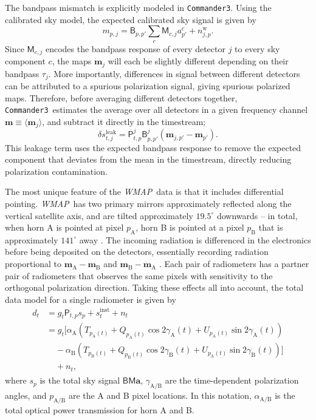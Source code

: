 \documentclass[twocolumn]{../../common/aa}
\def\WMAP{\emph{WMAP}}
\def\commanderthree{\texttt{Commander3}}
\newcommand{\A}[0]{\mathrm{A}}
\newcommand{\B}[0]{\mathrm{B}}
\begin{document}
The bandpass mismatch is explicitly modeled in \commanderthree. Using the calibrated sky model, the expected calibrated sky signal is given by
\begin{equation}
	m_{p,j}=\mathsf B_{p,p'}\sum_c\mathsf M_{c,j}a^c_{p'}+n_{j,p}^\mathrm w.
\end{equation}
Since $\mathsf M_{c,j}$ encodes the bandpass response of every detector $j$ to every sky component $c$, the maps $\boldsymbol m_j$ will each be slightly different depending on their bandpass $\tau_j$. More importantly, differences in signal between different detectors can be attributed to a spurious polarization signal, giving spurious polarized maps. Therefore, before averaging different detectors together, \commanderthree\ estimates the average over all detectors in a given frequency channel $\boldsymbol m\equiv \langle \boldsymbol m_j\rangle$, and subtract it directly in the timestream;
\begin{equation}
	\delta s_{t,j}^\mathrm{leak}=\mathsf P_{t,p}^j\mathsf B_{p,p'}^j\left(\boldsymbol m_{j,p'}-\boldsymbol m_{p'}\right).
\end{equation}
This leakage term uses the expected bandpass response to remove the expected component that deviates from the mean in the timestream, directly reducing polarization contamination.


The most unique feature of the \WMAP\ data is that it includes differential pointing.  \WMAP\ has two primary mirrors approximately reflected along the vertical satellite axis, and are tilted approximately $19.5^\circ$ downwards -- in total, when horn A is pointed at pixel $p_\A$, horn B is pointed at a pixel $p_\B$ that is approximately $141^\circ$ away \citep{page2003:MAP}. The incoming radiation is differenced in the electronics before being deposited on the detectors, essentially recording radiation proportional to $\boldsymbol m_\A-\boldsymbol m_\B$ and $\boldsymbol m_\B-\boldsymbol m_\A$ \citep{jarosik2003:MAP}. Each pair of radiometers has a partner pair of radiometers that observes the same pixels with sensitivity to the orthogonal polarization direction. Taking these effects all into account, the total data model for a single radiometer is given by
\begin{align}
	d_{t}&=g_{t}\mathsf P_{t,p}s_{p} + s^\mathrm{inst}_t+n_t
	\\
	&=g_t\Big[\alpha_\A(T_{p_\A(t)}+Q_{p_\A(t)}\cos2\gamma_\A(t) + U_{p_\A(t)}\sin2\gamma_\A(t))
	\nonumber
	\\
	&\phantom{g_t\Big[}-
	\alpha_\B(T_{p_\B(t)}+Q_{p_\B(t)}\cos2\gamma_\B(t) + U_{p_\A(t)}\sin2\gamma_\B(t))\Big]
	\nonumber
	\\
	&\phantom{g_t\Big[}
	+n_t,
\end{align}
where $s_p$ is the total sky signal $\mathsf B\mathsf M\boldsymbol a$, $\gamma_{\A/\B}$ are the time-dependent polarization angles, and $p_{\A/\B}$ are the A and B pixel locations. In this notation, $\alpha_{\A/\B}$ is the total optical power transmission for horn A and B.
\end{document}
